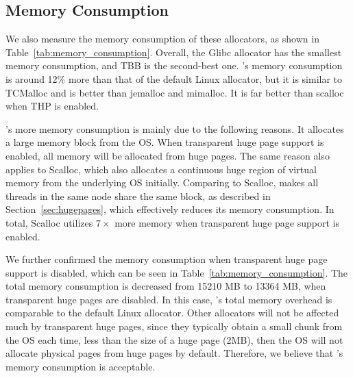 \subsection{Memory Consumption}
\label{sec:memory}



We also measure the memory consumption of these allocators, as shown in Table~\ref{tab:memory_consumption}.
Overall, the Glibc allocator has the smallest memory consumption, and TBB is the second-best one. \NM{}'s memory consumption is around 12\% more than that of the default Linux allocator, but it is similar to TCMalloc and is better than jemalloc and mimalloc. It is far better than scalloc when THP is enabled. 

\NM{}'s more memory consumption is mainly due to the following reasons. It allocates a large memory block from the OS. When transparent huge page support is enabled, all memory will be allocated from huge pages. The same reason also applies to Scalloc, which also allocates a continuous huge region of virtual memory from the underlying OS initially. Comparing to Scalloc, \NM{} makes all threads in the same node share the same block, as described in Section~\ref{sec:hugepages}, which effectively reduces its memory consumption. In total, Scalloc utilizes $7\times$ more memory when transparent huge page support is enabled.  

We further confirmed the memory consumption when transparent huge page support is disabled, which can be seen in Table~\ref{tab:memory_consumption}. The total memory consumption is decreased from 15210 MB to 13364 MB, when transparent huge pages are disabled. In this case, \NM{}'s total memory overhead is comparable to the default Linux allocator. Other allocators will not be affected much by transparent huge pages, since they typically obtain a small chunk from the OS each time, less than the size of a huge page (2MB), then the OS will not allocate physical pages from huge pages by default. Therefore, we believe that \NM{}'s memory consumption is acceptable. 

